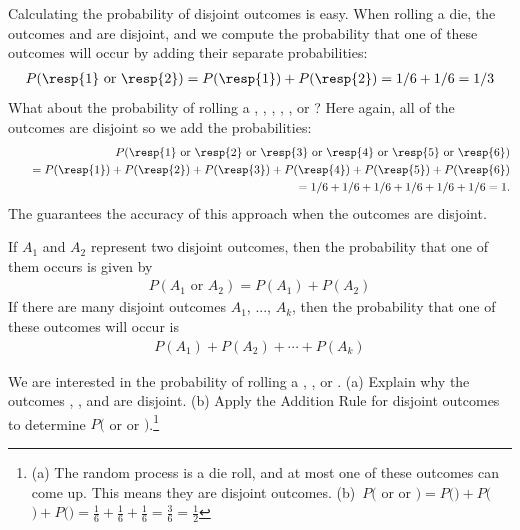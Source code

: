 Calculating the probability of disjoint outcomes is easy. When rolling a die, the outcomes  and  are disjoint, and we compute the probability that one of these outcomes will occur by adding their separate probabilities:
\begin{eqnarray*}
P(\text{\resp{1} or \resp{2}}) = P(\text{\resp{1}})+P(\text{\resp{2}}) = 1/6 + 1/6 = 1/3
\end{eqnarray*}
What about  the probability of rolling a , , , , , or ? Here again, all of the outcomes are disjoint so we add the probabilities:
\begin{eqnarray*}
&&P(\text{\resp{1} or \resp{2} or \resp{3} or \resp{4} or \resp{5} or \resp{6}}) \\
	&&\quad= P(\text{\resp{1}})+P(\text{\resp{2}})+P(\text{\resp{3}})+P(\text{\resp{4}})+P(\text{\resp{5}})+P(\text{\resp{6}}) \\
	&&\quad= 1/6 + 1/6 + 1/6 + 1/6 + 1/6 + 1/6 = 1.
\end{eqnarray*}
The  guarantees the accuracy of this approach when the outcomes are disjoint.

\begin{termBox}{ If $A_1$ and $A_2$ represent two disjoint outcomes, then the probability that one of them occurs is given by
\begin{eqnarray*}
P(A_1\text{ or } A_2) = P(A_1) + P(A_2)
\end{eqnarray*}
If there are many disjoint outcomes $A_1$, ..., $A_k$, then the probability that one of these outcomes will occur is
\begin{eqnarray}
P(A_1) + P(A_2) + \cdots + P(A_k)
\end{eqnarray}
}
\end{termBox}

\begin{exercise}
We are interested in the probability of rolling a , , or . (a) Explain why the outcomes , , and  are disjoint. (b) Apply the Addition Rule for disjoint outcomes to determine $P($ or  or $)$.\footnote{(a) The random process is a die roll, and at most one of these outcomes can come up. This means they are disjoint outcomes. (b)~$P($ or  or $) = P($$)+P($$)+P($$) = \frac{1}{6} + \frac{1}{6} + \frac{1}{6} = \frac{3}{6} = \frac{1}{2}$}
\end{exercise}

